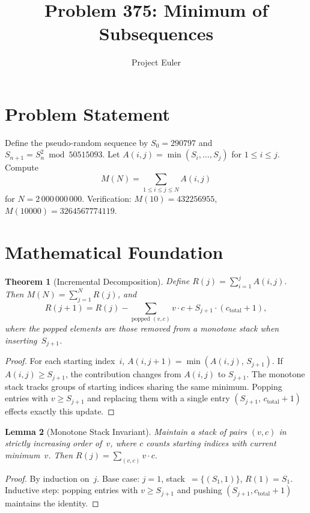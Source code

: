 \documentclass[12pt]{article}
\title{Problem 375: Minimum of Subsequences}
\author{Project Euler}
\date{}
\newtheorem{theorem}{Theorem}
\newtheorem{lemma}[theorem]{Lemma}
\begin{document}
\maketitle

\section{Problem Statement}

Define the pseudo-random sequence by $S_0 = 290797$ and $S_{n+1} = S_n^2 \bmod 50515093$. Let $A(i,j) = \min(S_i,\ldots,S_j)$ for $1 \le i \le j$. Compute
\[
M(N) = \sum_{1 \le i \le j \le N} A(i,j)
\]
for $N = 2\,000\,000\,000$. Verification: $M(10) = 432256955$, $M(10000) = 3264567774119$.

\section{Mathematical Foundation}

\begin{theorem}[Incremental Decomposition]
Define $R(j) = \sum_{i=1}^{j} A(i,j)$. Then $M(N) = \sum_{j=1}^{N}R(j)$, and
\[
R(j{+}1) = R(j) - \sum_{\text{popped }(v,c)} v\cdot c + S_{j+1}\cdot(c_{\mathrm{total}}+1),
\]
where the popped elements are those removed from a monotone stack when inserting~$S_{j+1}$.
\end{theorem}

\begin{proof}
For each starting index~$i$, $A(i,j{+}1) = \min(A(i,j),\,S_{j+1})$. If $A(i,j) \ge S_{j+1}$, the contribution changes from $A(i,j)$ to $S_{j+1}$. The monotone stack tracks groups of starting indices sharing the same minimum. Popping entries with $v \ge S_{j+1}$ and replacing them with a single entry $(S_{j+1},\,c_{\mathrm{total}}+1)$ effects exactly this update.
\end{proof}

\begin{lemma}[Monotone Stack Invariant]
Maintain a stack of pairs $(v,c)$ in strictly increasing order of~$v$, where $c$ counts starting indices with current minimum~$v$. Then $R(j) = \sum_{(v,c)}v\cdot c$.
\end{lemma}

\begin{proof}
By induction on~$j$. Base case: $j=1$, stack~$=\{(S_1,1)\}$, $R(1)=S_1$. Inductive step: popping entries with $v \ge S_{j+1}$ and pushing $(S_{j+1}, c_{\mathrm{total}}+1)$ maintains the identity.
\end{proof}
\end{document}
